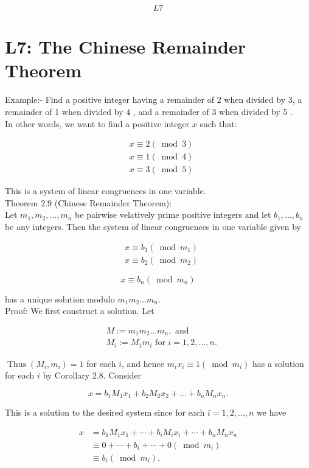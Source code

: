 \documentclass[10pt]{article}
\begin{document}
$$
L 7
$$

\section*{L7: The Chinese Remainder Theorem}
Example:- Find a positive integer having a remainder of 2 when divided by 3, a remainder of 1 when divided by 4 , and a remainder of 3 when divided by 5 .\\
In other words, we want to find a positive integer $x$ such that:

$$
\begin{aligned}
& x \equiv 2(\bmod 3) \\
& x \equiv 1(\bmod 4) \\
& x \equiv 3(\bmod 5)
\end{aligned}
$$

This is a system of linear congruences in one variable.\\
Theorem 2.9 (Chinese Remainder Theorem):\\
Let $m_{1}, m_{2}, \ldots, m_{n}$ be pairwise velatively prime positive integers and let $b_{1}, \ldots, b_{n}$ be any integers. Then the system of linear congruences in one variable given by

$$
\begin{aligned}
& x \equiv b_{1}\left(\bmod m_{1}\right) \\
& x \equiv b_{2}\left(\bmod m_{2}\right)
\end{aligned}
$$

$$
x \equiv b_{n}\left(\bmod m_{n}\right)
$$

has a unique solution modulo $m_{1} m_{2} \ldots m_{n}$.\\
Proof: We first construct a solution. Let

$$
\begin{aligned}
& M:=m_{1} m_{2} \ldots m_{n}, \text { and } \\
& M_{i}:=M_{1} m_{i} \text { for } i=1,2, \ldots, n .
\end{aligned}
$$

$\operatorname{Thus}\left(M_{i}, m_{i}\right)=1$ for each $i$, and hence $m_{i} x_{i} \equiv 1\left(\bmod m_{i}\right)$ has a solution for each $i$ by Corollary 2.8. Consider

$$
x=b_{1} M_{1} x_{1}+b_{2} M_{2} x_{2}+\ldots+b_{n} M_{n} x_{n} .
$$

This is a solution to the desired system since for each $i=1,2, \ldots, n$ we have

$$
\begin{aligned}
x & =b_{1} M_{1} x_{1}+\cdots+b_{i} M_{i} x_{i}+\cdots+b_{n} M_{n} x_{n} \\
& \equiv 0+\cdots+b_{i}+\cdots+0\left(\bmod m_{i}\right) \\
& \equiv b_{i}\left(\bmod m_{i}\right) .
\end{aligned}
$$
\end{document}

